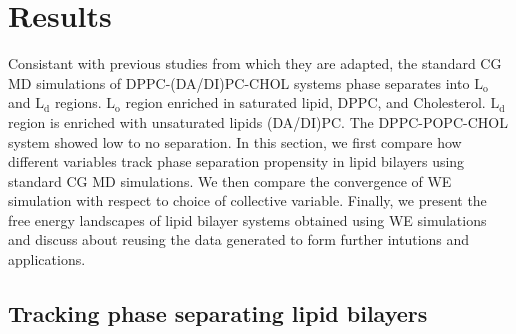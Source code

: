 \documentclass{biophys-new}
\begin{document}
\section*{Results}

Consistant with previous studies from which they are adapted, the standard CG MD simulations of DPPC-(DA/DI)PC-CHOL systems phase separates into $\text{L}_{\text{o}}$ and $\text{L}_{\text{d}}$ regions.
$\text{L}_{\text{o}}$ region enriched in saturated lipid, DPPC, and Cholesterol. 
$\text{L}_{\text{d}}$ region is enriched with unsaturated lipids (DA/DI)PC.
The DPPC-POPC-CHOL system showed low to no separation.
In this section, we first compare how different variables track phase separation propensity in lipid bilayers using standard CG MD simulations.
We then compare the convergence of WE simulation with respect to choice of collective variable.
Finally, we present the free energy landscapes of lipid bilayer systems obtained using WE simulations and discuss about reusing the data generated to form further intutions and applications.

\subsection*{Tracking phase separating lipid bilayers}
\end{document}
